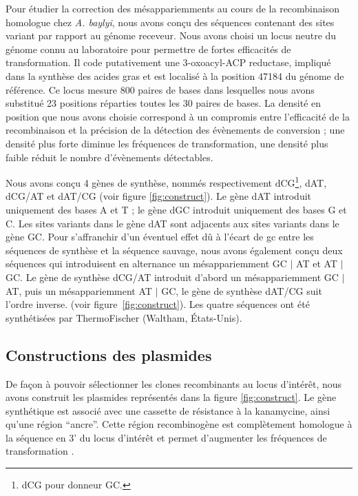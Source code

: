Pour étudier la correction des mésappariemments au cours de la recombinaison
homologue chez \emph{A. baylyi}, nous avons conçu des séquences contenant des
sites variant par rapport au génome receveur. Nous avons choisi un locus neutre
du génome connu au laboratoire pour permettre de fortes efficacités de
transformation. Il code putativement une 3-oxoacyl-ACP reductase, impliqué dans
la synthèse des acides gras\cite{vallenet_microscopeintegrated_2013} et est
localisé à la position \num{47184} du génome de référence. Ce locus mesure
\num{800} paires de bases dans lesquelles nous avons substitué \num{23}
positions réparties toutes les \num{30} paires de bases. La densité en position
que nous avons choisie correspond à un compromis entre l'efficacité de la
recombinaison et la précision de la détection des évènements de conversion ; une
densité plus forte diminue les fréquences de transformation, une densité plus
faible réduit le nombre d'évènements détectables.

Nous avons conçu 4 gènes de synthèse, nommés respectivement dCG\footnote{dCG
  pour donneur GC.}, dAT, dCG/AT et dAT/CG (voir figure \ref{fig:construct}). Le
gène dAT introduit uniquement des bases A et T ; le gène dGC introduit
uniquement des bases G et C. Les sites variants dans le gène dAT sont adjacents
aux sites variants dans le gène GC. Pour s'affranchir d'un éventuel effet dû à
l'écart de \ac{gc} entre les séquences de synthèse et la séquence sauvage, nous
avons également conçu deux séquences qui introduisent en alternance un
mésappariemment GC $|$ AT et AT $|$ GC. Le gène de synthèse dCG/AT introduit
d'abord un mésappariemment GC $|$ AT, puis un mésappariemment AT $|$ GC, le gène
de synthèse dAT/CG suit l'ordre inverse. (voir figure~\ref{fig:construct}). Les
quatre séquences ont été synthétisées par ThermoFischer (Waltham, États-Unis).

\subsection{Constructions des plasmides}
\label{subsec:constructions}

De façon à pouvoir sélectionner les clones recombinants au locus d'intérêt, nous
avons construit les plasmides représentés dans la figure \ref{fig:construct}. Le
gène synthétique est associé avec une cassette de résistance à la kanamycine,
ainsi qu'une région ``ancre''. Cette région recombinogène est complètement
homologue à la séquence en 3' du locus d'intérêt et permet d'augmenter les
fréquences de transformation \cite{de_vries_integration_2002,meier_mechanisms_2003}.


